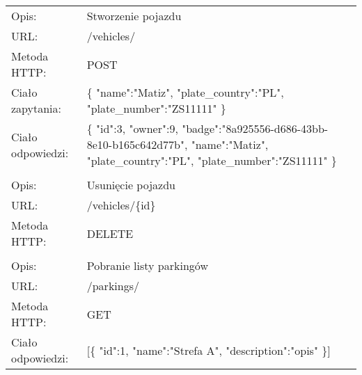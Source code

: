 \begin{longtable}{p{3.5cm}  p{11cm}}
	Opis:&Stworzenie pojazdu\\
	URL:&/vehicles/\\
	Metoda HTTP:&POST\\
	Ciało zapytania:&\{\newline
	\-\hspace{1cm}"name":"Matiz",\newline
	\-\hspace{1cm}"plate\_country":"PL",\newline
	\-\hspace{1cm}"plate\_number":"ZS11111"\newline
	\}\\
	Ciało odpowiedzi:&\{\newline
	\-\hspace{1cm}"id":3,\newline
	\-\hspace{1cm}"owner":9,\newline
	\-\hspace{1cm}"badge":"8a925556-d686-43bb-8e10-b165c642d77b",\newline
	\-\hspace{1cm}"name":"Matiz",\newline
	\-\hspace{1cm}"plate\_country":"PL",\newline
	\-\hspace{1cm}"plate\_number":"ZS11111"\newline
	\}\\
	
	&\\
	
	Opis:&Usunięcie pojazdu\\
	URL:&/vehicles/\{id\}\\
	Metoda HTTP:&DELETE\\
	
	&\\
	
	Opis:&Pobranie listy parkingów\\
	URL:&/parkings/\\
	Metoda HTTP:&GET\\
	Ciało odpowiedzi:&[\{\newline
	\-\hspace{1cm}"id":1,\newline
	\-\hspace{1cm}"name":"Strefa A",\newline
	\-\hspace{1cm}"description":"opis"\newline
	\}]\\
	

\end{longtable}
